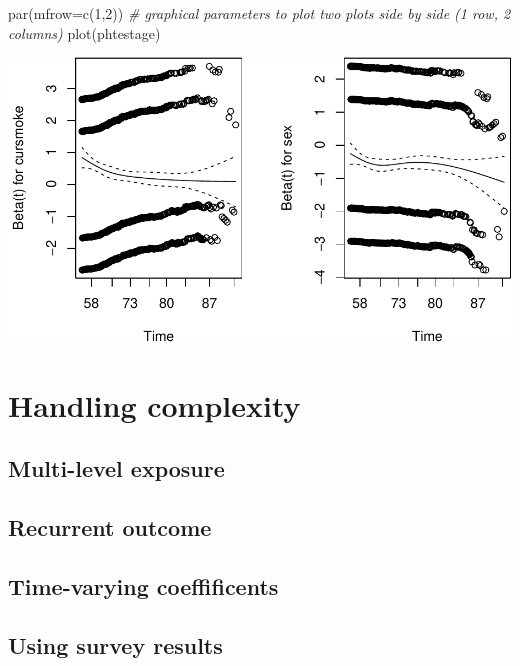 \documentclass[
]{book}
\newenvironment{Shaded}{\begin{snugshade}}{\end{snugshade}}
\newcommand{\AttributeTok}[1]{\textcolor[rgb]{0.77,0.63,0.00}{#1}}
\newcommand{\CommentTok}[1]{\textcolor[rgb]{0.56,0.35,0.01}{\textit{#1}}}
\newcommand{\DecValTok}[1]{\textcolor[rgb]{0.00,0.00,0.81}{#1}}
\newcommand{\FunctionTok}[1]{\textcolor[rgb]{0.00,0.00,0.00}{#1}}
\newcommand{\NormalTok}[1]{#1}
\begin{document}
\begin{Shaded}
\begin{Highlighting}[]
\FunctionTok{par}\NormalTok{(}\AttributeTok{mfrow=}\FunctionTok{c}\NormalTok{(}\DecValTok{1}\NormalTok{,}\DecValTok{2}\NormalTok{)) }\CommentTok{\# graphical parameters to plot two plots side by side (1 row, 2 columns)}
\FunctionTok{plot}\NormalTok{(phtestage)}
\end{Highlighting}
\end{Shaded}

\includegraphics{adv_epi_analysis_files/figure-latex/unnamed-chunk-217-1.pdf}

\hypertarget{handling-complexity}{%
\section{Handling complexity}\label{handling-complexity}}

\hypertarget{multi-level-exposure}{%
\subsection{Multi-level exposure}\label{multi-level-exposure}}

\hypertarget{recurrent-outcome}{%
\subsection{Recurrent outcome}\label{recurrent-outcome}}

\hypertarget{time-varying-coeffificents}{%
\subsection{Time-varying coeffificents}\label{time-varying-coeffificents}}

\hypertarget{using-survey-results}{%
\subsection{Using survey results}\label{using-survey-results}}
\end{document}
